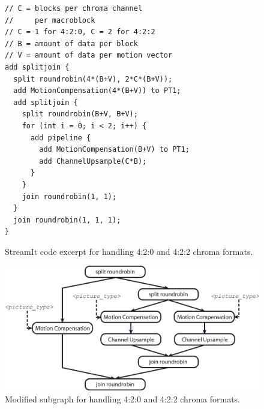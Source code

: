 \begin{figure}
\begin{center}
  \begin{minipage}[t]{3.5in}
    \begin{small}
      \begin{verbatim}
// C = blocks per chroma channel 
//     per macroblock 
// C = 1 for 4:2:0, C = 2 for 4:2:2
// B = amount of data per block
// V = amount of data per motion vector
add splitjoin {
  split roundrobin(4*(B+V), 2*C*(B+V));
  add MotionCompensation(4*(B+V)) to PT1;
  add splitjoin {
    split roundrobin(B+V, B+V);
    for (int i = 0; i < 2; i++) {
      add pipeline {
        add MotionCompensation(B+V) to PT1;
        add ChannelUpsample(C*B);
      }
    }
    join roundrobin(1, 1);
  }
  join roundrobin(1, 1, 1);
}
      \end{verbatim}
    \end{small}
  \end{minipage}

  \caption{StreamIt code excerpt for handling
           4:2:0 and 4:2:2 chroma formats.}
  \label{fig:chroma-format-code-streamit}
\end{center}
\end{figure}

\begin{figure}
  \begin{center}
    \includegraphics[scale=0.5, angle=0]{./chroma_splitjoin.eps}
    \caption{Modified subgraph for handling 4:2:0 and 4:2:2 chroma formats.}
    \label{fig:chroma-format-graph}
  \end{center}
\end{figure}

